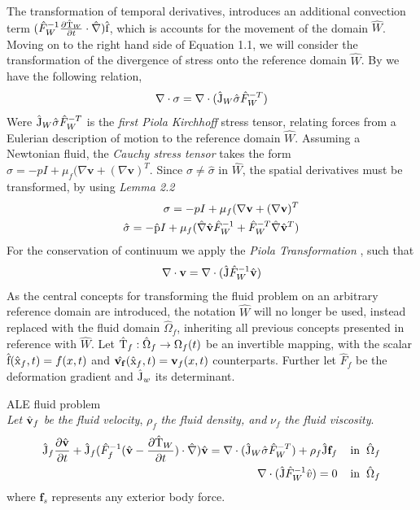 The transformation of temporal derivatives, introduces an additional convection term 
$ (\hat{F}_W^{-1} \frac{\partial \text{\^{T}}_W}{\partial t} \cdot \hat{\nabla}) \text{\^{f}}$, which is accounts for the movement of the domain $\hat{W}$. 
Moving on to the right hand side of Equation 1.1, we will consider the transformation of the divergence of stress onto the reference domain $\hat{W}$. By \cite{Richter2016} we have the following relation,
\begin{align}
\nabla \cdot \sigma = \nabla \cdot (\text{\^{J}}_W \hat{\sigma}\hat{F}_W^{-T})
\end{align}
Were $\text{\^{J}}_W \hat{\sigma}\hat{F}_W^{-T}$ is the \textit{first Piola Kirchhoff} stress tensor, relating forces from a Eulerian description of motion to the reference domain $\hat{W}$.
Assuming a Newtonian fluid, the \textit{Cauchy stress tensor} takes the form $\sigma = -p I + \mu_f(\nabla \mathbf{v} + (\nabla \mathbf{v})^T$. Since $\sigma \neq \hat{\sigma}$ in $\hat{W}$, the spatial derivatives must be transformed, by using \textit{Lemma 2.2}
\begin{align*}
\sigma = -p I + \mu_f(\nabla \mathbf{v} + (\nabla \mathbf{v})^T \\
\hat{\sigma} = -\text{\^{p}} I + \mu_f(\hat{\nabla}\hat{\mathbf{v}}\hat{F}_W^{-1} +\hat{F}_W^{-T}\hat{\nabla}\hat{\mathbf{v}}^T )
\end{align*} 
For the conservation of continuum we apply the \textit{Piola Transformation} \cite{Richter2016}, such that
\begin{align}
\nabla \cdot \mathbf{v} = \nabla \cdot (\text{\^{J}} \hat{F}_W^{-1} \hat{\mathbf{v}})
\end{align}
As the central concepts for transforming the fluid problem on an arbitrary reference domain are introduced, the notation $\hat{W}$ will no longer be used, instead replaced with the fluid domain $\hat{\Omega}_f$, inheriting all previous concepts presented in reference with $\hat{W}$.
 Let $\text{\^{T}}_f : \hat{\Omega}_f \rightarrow \Omega_f (t)$ be an invertible mapping, with the scalar $\text{\^{f}}(\text{\^{x}}_f, t) = f(x,t) $ and $\hat{\mathbf{v_f}}(\text{\^{x}}_f, t) = \mathbf{v}_f (x,t) $ counterparts. Further let $\hat{F}_f$ be the deformation gradient and $\text{\^{J}}_w$ its determinant.
\begin{equat}
ALE fluid problem \\ 
\textit{Let } $\hat{\mathbf{v}}_f$ \textit{be the fluid velocity}, $\rho_f$ \textit{the fluid density, and } $\nu_f$ \textit{the fluid viscosity}.
\begin{align}
\text{\^{J}}_f \frac{\partial \hat{\mathbf{v}}}{\partial t} + \text{\^{J}}_f (\hat{F}_f^{-1}(\hat{\mathbf{v}} - \frac{\partial \text{\^{T}}_W}{\partial t}) \cdot \hat{\nabla}) \hat{\mathbf{v}}
= \nabla \cdot (\text{\^{J}}_W \hat{\sigma}\hat{F}_W^{-T}) + \rho_f \text{\^{J}} \mathbf{f}_f
\hspace{4mm} \text{in} \hspace{2mm} \hat{\Omega}_f \\
\nabla \cdot (\text{\^{J}} \hat{F}_W^{-1} \hat{v}) = 0 \hspace{4mm} \text{in} \hspace{2mm} \hat{\Omega}_f 
\end{align}
where $\mathbf{f}_s$ represents any exterior body force.
\end{equat}
